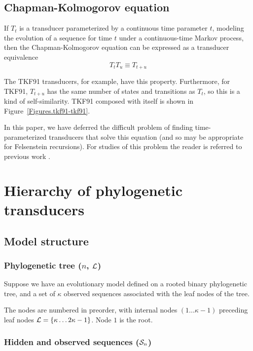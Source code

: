 \documentclass{article}
\newcommand{\seclabel}[1]{\label{sec.#1}}
\newcommand{\figref}[1]{Figure~\ref{Figures.#1}}
\newcommand\transequiv{\equiv}
\newcommand\compose{}
\newcommand\numberofleaves{\kappa}
\newcommand\numberofinternalnodes{\numberofleaves - 1}
\newcommand\numberofnodes{2\numberofleaves - 1}
\newcounter{LeafIndex}
\newcommand\leafnode[1]{\numberofleaves \ifthenelse{\equal{#1}{1}}{}{\setcounter{LeafIndex}{#1} \addtocounter{LeafIndex}{-1} +\arabic{LeafIndex}}}
\newcommand\leaves{{\cal L}}
\newcommand\outputn[1]{{\cal S}_{#1}}
\begin{document}
\subsection{Chapman-Kolmogorov equation}
\seclabel{ChapmanKolmogorov}

If $T_t$ is a transducer parameterized by a continuous time parameter $t$,
modeling the evolution of a sequence for time $t$ under a continuous-time Markov process,
then the Chapman-Kolmogorov equation \cite{KarlinTaylor75} can be expressed as a transducer equivalence
\[
T_t \compose T_u \transequiv T_{t+u}
\]

The TKF91 transducers, for example, have this property.
Furthermore, for TKF91, $T_{t+u}$ has the same number of states and transitions as $T_t$,
so this is a kind of self-similarity.
TKF91 composed with itself is shown in \figref{tkf91-tkf91}. 

In this paper, we have deferred the difficult problem of finding time-parameterized transducers that solve this equation
(and so may be appropriate for Felsenstein recursions).
For studies of this problem the reader is referred to previous work \cite{ThorneEtal91,ThorneEtal92,KnudsenMiyamoto2003,MiklosLunterHolmes2004,Rivas05}.

\section{Hierarchy of phylogenetic transducers}
\seclabel{Hierarchy}

\subsection{Model structure}
\seclabel{ModelStructure}
\subsubsection{Phylogenetic tree ($n$, $\leaves$)}
Suppose we have an evolutionary model defined on a rooted binary phylogenetic tree,
and a set of $\numberofleaves$ observed sequences associated with the leaf nodes of the tree.

The nodes are numbered in preorder, with internal nodes $(1 \ldots \numberofinternalnodes)$ preceding leaf nodes $\leaves = \{ \leafnode{1} \ldots \numberofnodes \}$. Node $1$ is the root.

\subsubsection{Hidden and observed sequences ($\outputn{n}$)}
\end{document}
